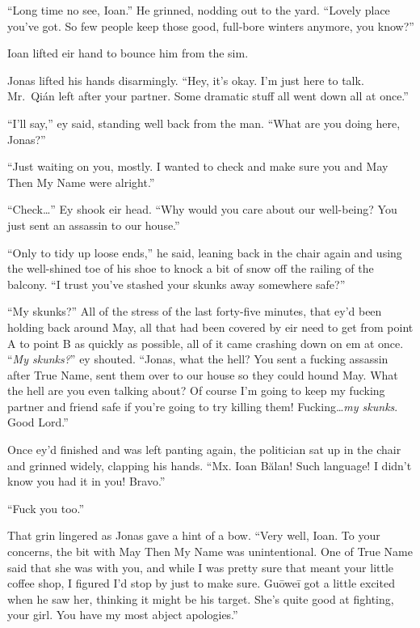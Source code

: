 ``Long time no see, Ioan.'' He grinned, nodding out to the yard. ``Lovely place you've got. So few people keep those good, full-bore winters anymore, you know?''

Ioan lifted eir hand to bounce him from the sim.

Jonas lifted his hands disarmingly. ``Hey, it's okay. I'm just here to talk. Mr.~Qián left after your partner. Some dramatic stuff all went down all at once.''

``I'll say,'' ey said, standing well back from the man. ``What are you doing here, Jonas?''

``Just waiting on you, mostly. I wanted to check and make sure you and May Then My Name were alright.''

``Check\ldots{}'' Ey shook eir head. ``Why would you care about our well-being? You just sent an assassin to our house.''

``Only to tidy up loose ends,'' he said, leaning back in the chair again and using the well-shined toe of his shoe to knock a bit of snow off the railing of the balcony. ``I trust you've stashed your skunks away somewhere safe?''

``My skunks?'' All of the stress of the last forty-five minutes, that ey'd been holding back around May, all that had been covered by eir need to get from point A to point B as quickly as possible, all of it came crashing down on em at once. ``\emph{My skunks?}'' ey shouted. ``Jonas, what the hell? You sent a fucking assassin after True Name, sent them over to our house so they could hound May. What the hell are you even talking about? Of course I'm going to keep my fucking partner and friend safe if you're going to try killing them! Fucking\ldots{}\emph{my skunks}. Good Lord.''

Once ey'd finished and was left panting again, the politician sat up in the chair and grinned widely, clapping his hands. ``Mx. Ioan Bălan! Such language! I didn't know you had it in you! Bravo.''

``Fuck you too.''

That grin lingered as Jonas gave a hint of a bow. ``Very well, Ioan. To your concerns, the bit with May Then My Name was unintentional. One of True Name said that she was with you, and while I was pretty sure that meant your little coffee shop, I figured I'd stop by just to make sure. Guōweī got a little excited when he saw her, thinking it might be his target. She's quite good at fighting, your girl. You have my most abject apologies.''

